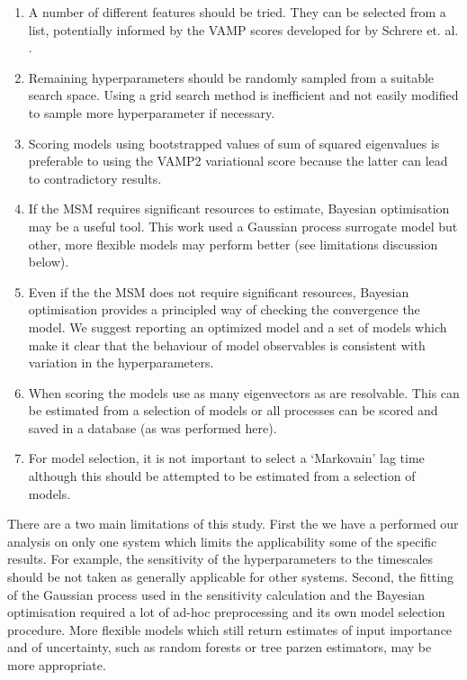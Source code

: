 \documentclass[journal=jacsat,manuscript=article]{achemso}
\begin{document}
\begin{enumerate}
    \item A number of different features should be tried. They can be selected from a list, potentially informed by the VAMP scores developed for by Schrere et. al. \cite{scherer_variational_2019}. 
    \item Remaining hyperparameters should be randomly sampled from a suitable search space. Using a grid search method is inefficient and not easily modified to sample more hyperparameter if necessary. 
    \item Scoring models using bootstrapped values of sum of squared eigenvalues is preferable to using the VAMP2 variational score because the latter can lead to contradictory results. 
    \item If the MSM requires significant resources to estimate, Bayesian optimisation may be a useful tool.  This work used a Gaussian process surrogate model but other, more flexible models may perform better (see limitations discussion below). 
    \item Even if the the MSM does not require significant resources, Bayesian optimisation provides a principled way of checking the convergence the model.  We suggest reporting an optimized model and a set of models which make it clear that the behaviour of model observables is consistent with variation in the hyperparameters. 
    \item When scoring the models use as many eigenvectors as are resolvable. This can be estimated from a selection of models or all processes can be scored and saved in a database (as was performed here).  
    \item For model selection, it is not important to select a `Markovain' lag time although this should be attempted to be estimated from a selection of models.  
\end{enumerate}

There are a two main limitations of this study.  First the we have a performed our analysis on only one system which limits the applicability some of the specific results. For example, the sensitivity of the hyperparameters to the timescales should be not taken as generally applicable for other systems. Second, the fitting of the Gaussian process used in the sensitivity calculation and the Bayesian optimisation required a lot of ad-hoc preprocessing and its own model selection procedure.  More flexible models which still return estimates of input importance and of uncertainty, such as random forests or tree parzen estimators, may be more appropriate.   
\end{document}
